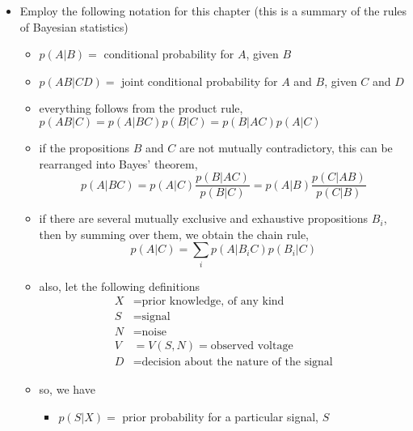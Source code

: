 \documentclass[../jaynes_prob_theory_notes.tex]{subfiles}
\begin{document}
            \begin{itemize} 
                \item Employ the following notation for this chapter (this is a summary of the rules of Bayesian statistics)
                    \begin{itemize} 
                        \item \(p(A|B) = \) conditional probability for \(A\), given \(B\)
                        \item \(p(AB|CD) = \) joint conditional probability for \(A\) and \(B\), given \(C\) and \(D\)
                        \item everything follows from the product rule, \(p(AB|C) = p(A|BC)p(B|C) = p(B|AC)p(A|C)\)
                        \item if the propositions \(B\) and \(C\) are not mutually contradictory, this can be rearranged into Bayes' theorem,
                            \begin{equation*} 
                                p(A|BC) = p(A|C) \frac{p(B|AC)}{p(B|C)} = p(A|B) \frac{p(C|AB)}{p(C|B)}
                            \end{equation*}
                        \item if there are several mutually exclusive and exhaustive propositions \(B_i\), then by summing over them, we obtain the chain rule,
                            \begin{equation*} 
                                p(A|C) = \sum\limits_i p(A|B_i C)p(B_i | C)
                            \end{equation*}
                        \item also, let the following definitions
                            \begin{align*} 
                                X &= \text{prior knowledge, of any kind} \\
                                S &= \text{signal} \\
                                N &= \text{noise} \\
                                V &= V(S,N) = \text{observed voltage} \\
                                D &= \text{decision about the nature of the signal}
                            \end{align*}
                        \item so, we have
                            \begin{itemize} 
                                \item[] \(p(S|X) =\) prior probability for a particular signal, \(S\)

\end{itemize}
\end{itemize}
\end{itemize}
\end{document}
